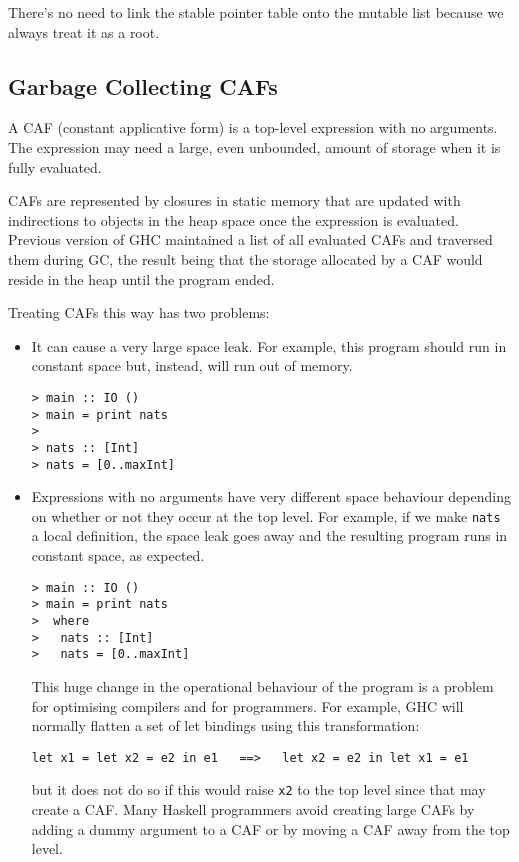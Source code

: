 \documentclass[11pt]{article}
\newcommand{\Subsection}[2]{\subsection{#1}\label{sec:#2}}
\begin{document}
There's no need to link the stable pointer table onto the mutable
list because we always treat it as a root.

\Subsection{Garbage Collecting CAFs}{CAF}

A CAF (constant applicative form) is a top-level expression with no
arguments.  The expression may need a large, even unbounded, amount of
storage when it is fully evaluated.

CAFs are represented by closures in static memory that are updated
with indirections to objects in the heap space once the expression is
evaluated.  Previous version of GHC maintained a list of all evaluated
CAFs and traversed them during GC, the result being that the storage
allocated by a CAF would reside in the heap until the program ended.

Treating CAFs this way has two problems:
\begin{itemize}
\item
It can cause a very large space leak.  For example, this program
should run in constant space but, instead, will run out of memory.
\begin{verbatim}
> main :: IO ()
> main = print nats
>
> nats :: [Int]
> nats = [0..maxInt]
\end{verbatim}

\item
Expressions with no arguments have very different space behaviour
depending on whether or not they occur at the top level.  For example, 
if we make \verb+nats+ a local definition, the space leak goes away 
and the resulting program runs in constant space, as expected.
\begin{verbatim}
> main :: IO ()
> main = print nats
>  where
>   nats :: [Int]
>   nats = [0..maxInt]
\end{verbatim}

This huge change in the operational behaviour of the program 
is a problem for optimising compilers and for programmers.
For example, GHC will normally flatten a set of let bindings using
this transformation:
\begin{verbatim}
let x1 = let x2 = e2 in e1   ==>   let x2 = e2 in let x1 = e1
\end{verbatim}
but it does not do so if this would raise \verb+x2+ to the top level
since that may create a CAF.  Many Haskell programmers avoid creating
large CAFs by adding a dummy argument to a CAF or by moving a CAF away
from the top level.

\end{itemize}
\end{document}
